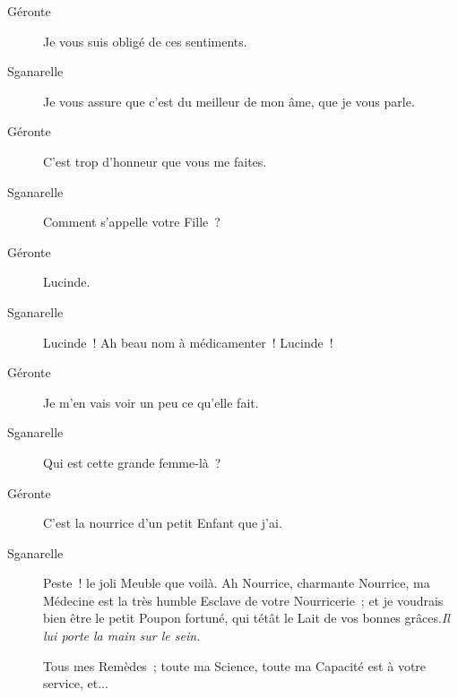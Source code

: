 \documentclass[french,twoside]{book} %
\begin{document}
 \begin{description} \item[Géronte] 

Je vous suis obligé de ces sentiments.\end{description}
 \begin{description} \item[Sganarelle] 

Je vous assure que c’est du meilleur de mon âme, que je vous parle.\end{description}
 \begin{description} \item[Géronte] 

C’est trop d’honneur que vous me faites.\end{description}
 \begin{description} \item[Sganarelle] 

Comment s’appelle votre Fille ?\end{description}
 \begin{description} \item[Géronte] 

Lucinde.\end{description}
 \begin{description} \item[Sganarelle] 

Lucinde ! Ah beau nom à médicamenter ! Lucinde !\end{description}
 \begin{description} \item[Géronte] 

Je m’en vais voir un peu ce qu’elle fait.\end{description}
 \begin{description} \item[Sganarelle] 

Qui est cette grande femme-là ?\end{description}
 \begin{description} \item[Géronte] 

C’est la nourrice d’un petit Enfant que j’ai.\end{description}
 \begin{description} \item[Sganarelle] 

Peste ! le joli Meuble que voilà. Ah Nourrice, charmante Nourrice, ma Médecine est la très humble Esclave de votre Nourricerie ; et je voudrais bien être le petit Poupon fortuné, qui tétât le Lait de vos bonnes grâces.\textit{Il lui porte la main sur le sein.} 

Tous mes Remèdes ; toute ma Science, toute ma Capacité est à votre service, et...\end{description}
\end{document}
